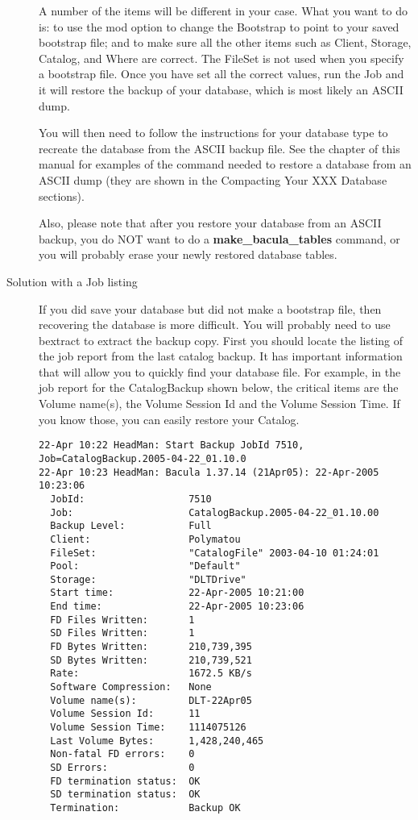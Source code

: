 \begin{description}
   A number of the items will be different in your case.  What you want to
   do is: to use the mod option to change the Bootstrap to point to your
   saved bootstrap file; and to make sure all the other items such as
   Client, Storage, Catalog, and Where are correct.  The FileSet is not
   used when you specify a bootstrap file.  Once you have set all the
   correct values, run the Job and it will restore the backup of your
   database, which is most likely an ASCII dump. 

   You will then need to follow the instructions for your
   database type to recreate the database from the ASCII backup file.
   See the  chapter of
   this manual for examples of the command needed to restore a 
   database from an ASCII dump (they are shown in the Compacting Your
   XXX Database sections).
    
   Also, please note that after you restore your database from an ASCII
   backup, you do NOT want to do a {\bf make\_bacula\_tables}  command, or
   you will probably erase your newly restored database tables.

      
\item[Solution with a Job listing]
   If you did save your database but did not make a bootstrap file, then
   recovering the database is more difficult.  You will probably need to
   use bextract to extract the backup copy.  First you should locate the
   listing of the job report from the last catalog backup.  It has
   important information that will allow you to quickly find your database
   file.  For example, in the job report for the CatalogBackup shown below,
   the critical items are the Volume name(s), the Volume Session Id and the
   Volume Session Time.  If you know those, you can easily restore your
   Catalog.

\footnotesize
\begin{verbatim}
22-Apr 10:22 HeadMan: Start Backup JobId 7510,
Job=CatalogBackup.2005-04-22_01.10.0
22-Apr 10:23 HeadMan: Bacula 1.37.14 (21Apr05): 22-Apr-2005 10:23:06
  JobId:                  7510
  Job:                    CatalogBackup.2005-04-22_01.10.00
  Backup Level:           Full
  Client:                 Polymatou
  FileSet:                "CatalogFile" 2003-04-10 01:24:01
  Pool:                   "Default"
  Storage:                "DLTDrive"
  Start time:             22-Apr-2005 10:21:00
  End time:               22-Apr-2005 10:23:06
  FD Files Written:       1
  SD Files Written:       1
  FD Bytes Written:       210,739,395
  SD Bytes Written:       210,739,521
  Rate:                   1672.5 KB/s
  Software Compression:   None
  Volume name(s):         DLT-22Apr05
  Volume Session Id:      11
  Volume Session Time:    1114075126
  Last Volume Bytes:      1,428,240,465
  Non-fatal FD errors:    0
  SD Errors:              0
  FD termination status:  OK
  SD termination status:  OK
  Termination:            Backup OK
\end{verbatim}
\normalsize


\end{description}
